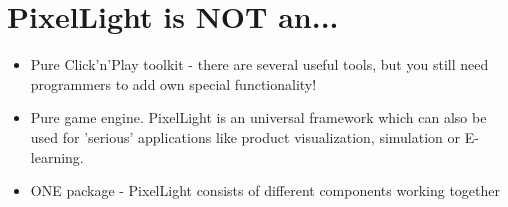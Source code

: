 \section{PixelLight is NOT an...}
\begin{itemize}
\item{Pure Click'n'Play toolkit - there are several useful tools, but you still need programmers to add own special functionality!}
\item{Pure game engine. PixelLight is an universal framework which can also be used for 'serious' applications like product visualization, simulation or E-learning.}
\item{ONE package - PixelLight consists of different components working together}
\end{itemize}






